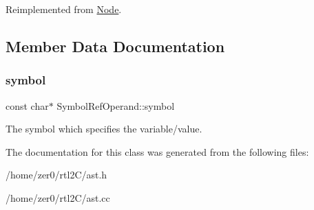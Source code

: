 Reimplemented from \hyperlink{class_node_a3e67ec8d22182b721717af14fe0c3000}{Node}.



\subsection{Member Data Documentation}
\mbox{\label{class_symbol_ref_operand_a3bd54497892f2bd316927b2931447826}} 
\subsubsection{\texorpdfstring{symbol}{symbol}}
{\footnotesize\ttfamily const char$\ast$ Symbol\+Ref\+Operand\+::symbol\hspace{0.3cm}{\ttfamily [protected]}}

The symbol which specifies the variable/value. 

The documentation for this class was generated from the following files\+:\begin{DoxyCompactItemize}
\item 
/home/zer0/rtl2\+C/ast.\+h\item 
/home/zer0/rtl2\+C/ast.\+cc\end{DoxyCompactItemize}
